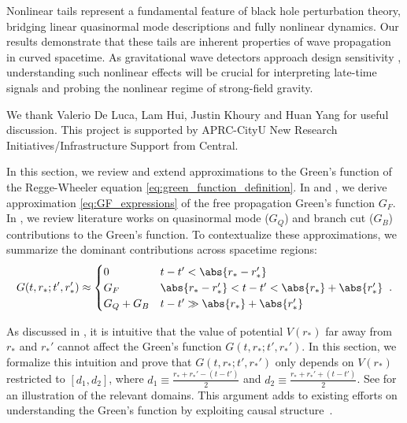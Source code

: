 Nonlinear tails represent a fundamental feature of black hole perturbation theory, bridging linear quasinormal mode descriptions and fully nonlinear dynamics.
Our results demonstrate that these tails are inherent properties of wave propagation in curved spacetime.
As gravitational wave detectors approach design sensitivity \cite{LIGOScientific:2018mvr,LIGOScientific:2020ibl,KAGRA:2021vkt}, understanding such nonlinear effects will be crucial for interpreting late-time signals and probing the nonlinear regime of strong-field gravity.



\acknowledgments

We thank Valerio De Luca, Lam Hui, Justin Khoury and Huan Yang for useful discussion. This project is supported by APRC-CityU New Research Initiatives/Infrastructure Support from Central.



\appendix

\label{sec:review_of_green_function}

In this section, we review and extend approximations to the Green's function of the Regge-Wheeler equation \eqref{eq:green_function_definition}.
In  and , we derive approximation \eqref{eq:GF_expressions} of the free propagation Green's function $G_F$.
In , we review literature works on quasinormal mode ($G_Q$) and branch cut ($G_B$) contributions to the Green's function.
To contextualize these approximations, we summarize the dominant contributions across spacetime regions:
\begin{align}
  G(t,r_*;t',r_*') \approx
  \begin{cases}
    0 & t-t' < \abs{r_* - r_*'} \\
    G_F & \abs{r_* - r_*'} < t-t' < \abs{r_*} + \abs{r_*'} \\
    G_Q + G_B & t-t' \gg \abs{r_*} + \abs{r_*'}
  \end{cases}
  \;.
\end{align}




\label{sec:causality_arguments}
As discussed in , it is intuitive that the value of potential $V(r_*)$ far away from $r_*$ and $r_*'$ cannot affect the Green's function $G(t,r_*;t',r_*')$.
In this section, we formalize this intuition and prove that $G(t,r_*;t',r_*')$ only depends on $V(r_*)$ restricted to $[d_1,d_2]$, where $d_1 \equiv \frac{r_*+r_*' - (t-t')}{2}$ and $d_2 \equiv \frac{r_*+r_*' + (t-t')}{2}$.
See  for an illustration of the relevant domains.
This argument adds to existing efforts on understanding the Green's function by exploiting causal structure~\cite{Hui:2019aox,Lagos:2022otp}.



